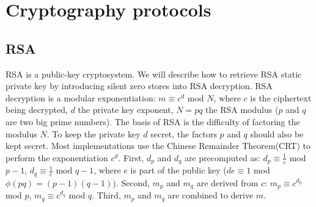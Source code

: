 \documentclass{iacrtrans}
\begin{document}
\section{Cryptography protocols}
\subsection{RSA}
RSA is a public-key cryptosystem. We will describe how to retrieve RSA static private key by introducing silent zero stores into RSA decryption. RSA decryption is a modular exponentiation: $m \equiv c^d$ mod $N$, where $c$ is the ciphertext being decrypted, $d$ the private key exponent, $N=pq$ the RSA modulus ($p$ and $q$ are two big prime numbers). The basis of RSA is the difficulty of factoring the modulus $N$. To keep the private key $d$ secret, the factors $p$ and $q$ should also be kept secret. Most implementations use the Chinese Remainder Theorem(CRT) to perform the exponentiation $c^d$. First, $d_p$ and $d_q$ are precomputed as: $d_p \equiv \frac{1}{e}$ mod $p-1$, $d_q \equiv \frac{1}{e}$ mod $q-1$, where $e$ is part of the public key ($de \equiv 1$ mod $\phi(pq) = (p-1)(q-1)$). Second, $m_p$ and $m_q$ are derived from $c$: $m_p \equiv c^{d_p}$ mod $p$, $m_q \equiv c^{d_q}$ mod $q$. Third, $m_p$ and $m_q$ are combined to derive $m$. 
\end{document}
